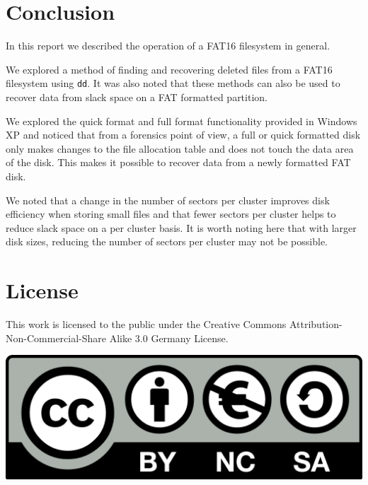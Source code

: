 \documentclass[a4paper,
    11pt,
    normalheadings,
    parindent,
    UKenglish,
    abstracton,
    ]{scrartcl}
\begin{document}
\section{Conclusion}
In this report we described the operation of a FAT16 filesystem in general.

We explored a method of finding and recovering deleted files from a FAT16 filesystem using \texttt{dd}. It was also noted that these methods can also be used to recover data from slack space on a FAT formatted partition.

We explored the quick format and full format functionality provided in Windows XP and noticed that from a forensics point of view, a full or quick formatted disk only makes changes to the file allocation table  and does not touch the data area of the disk. This makes it possible to recover data from a newly formatted FAT disk.

We noted that a change in the number of sectors per cluster improves disk efficiency when storing small files and that fewer sectors per cluster helps to reduce slack space on a per cluster basis. It is worth noting here that with larger disk sizes, reducing the number of sectors per cluster may not be possible.


\section*{License}
This work is licensed to the public under the Creative Commons Attribution-Non-Commercial-Share Alike 3.0 Germany License.
\begin{center}\includegraphics{bin/by-nc-sa-eu.png}\end{center}
\end{document}
